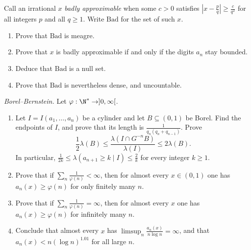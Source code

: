 \begin{exercise}[$\star$]\label{pb:badnull}
Call an irrational $x$ \emph{badly approximable} when some $c>0$ satisfies $|x-\frac pq|\ge\frac c{q^2}$ for all integers $p$ and all $q\ge1$. Write $\mathrm{Bad}$ for the set of such $x$.
\begin{enumerate}[label=(\alph*)]
\item Prove that $\mathrm{Bad}$ is meagre.
\item Prove that $x$ is badly approximable if and only if the digits $a_n$ stay bounded.
\item Deduce that $\mathrm{Bad}$ is a null set.
\item Prove that $\mathrm{Bad}$ is nevertheless dense, and uncountable.
\end{enumerate}
\end{exercise}

\begin{exercise}[$\star\star$]\label{pb:borelbernstein}
\emph{Borel--Bernstein.} Let $\varphi:\N^*\to]0,\infty[$.
\begin{enumerate}[label=(\alph*)]
\item Let $I=I(a_1,\dots,a_n)$ be a cylinder and let $B\subseteq(0,1)$ be Borel. Find the endpoints of $I$, and prove that its length is $\frac1{q_n(q_n+q_{n-1})}$. Prove
\[
\frac12\lambda(B)\le\frac{\lambda(I\cap G^{-n}B)}{\lambda(I)}\le2\lambda(B).
\]
In particular, $\frac1{2k}\le\lambda(a_{n+1}\ge k\mid I)\le\frac2k$ for every integer $k\ge1$.
\item Prove that if $\sum_n\frac1{\varphi(n)}<\infty$, then for almost every $x\in(0,1)$ one has $a_n(x)\ge\varphi(n)$ for only finitely many $n$.
\item Prove that if $\sum_n\frac1{\varphi(n)}=\infty$, then for almost every $x$ one has $a_n(x)\ge\varphi(n)$ for infinitely many $n$.
\item Conclude that almost every $x$ has $\limsup_n\frac{a_n(x)}{n\log n}=\infty$, and that $a_n(x)<n(\log n)^{1.01}$ for all large $n$.
\end{enumerate}
\end{exercise}

